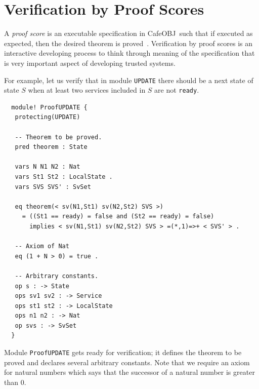 \documentclass[12pt]{report}
\newcommand{\cafeobj}{{\sf CafeOBJ}~}
\begin{document}
\section{Verification by Proof Scores}
\label{sec:pscore}
A {\it proof score} is an executable specification in \cafeobj such
that if executed as expected, then the desired theorem is
proved~\cite{FutatsugiGO12pps}. Verification by proof scores is an
interactive developing process to think through meaning of the
specification that is very important aspect of developing trusted
systems.

For example, let us verify that in module {\tt UPDATE} there should be
a next state of state $S$ when at least two services included in $S$
are not {\tt ready}.
\small
\begin{verbatim}
  module! ProofUPDATE {
   protecting(UPDATE)
  
   -- Theorem to be proved.
   pred theorem : State
  
   vars N N1 N2 : Nat
   vars St1 St2 : LocalState .
   vars SVS SVS' : SvSet
  
   eq theorem(< sv(N1,St1) sv(N2,St2) SVS >)
     = ((St1 == ready) = false and (St2 == ready) = false)
       implies < sv(N1,St1) sv(N2,St2) SVS > =(*,1)=>+ < SVS' > .
  
   -- Axiom of Nat
   eq (1 + N > 0) = true .
  
   -- Arbitrary constants.
   op s : -> State
   ops sv1 sv2 : -> Service
   ops st1 st2 : -> LocalState
   ops n1 n2 : -> Nat
   op svs : -> SvSet
  }
\end{verbatim}
\normalsize
Module {\tt ProofUPDATE} gets ready for verification; it defines the
theorem to be proved and declares several arbitrary constants.  Note
that we require an axiom for natural numbers which says that the
successor of a natural number is greater than 0.
\end{document}
